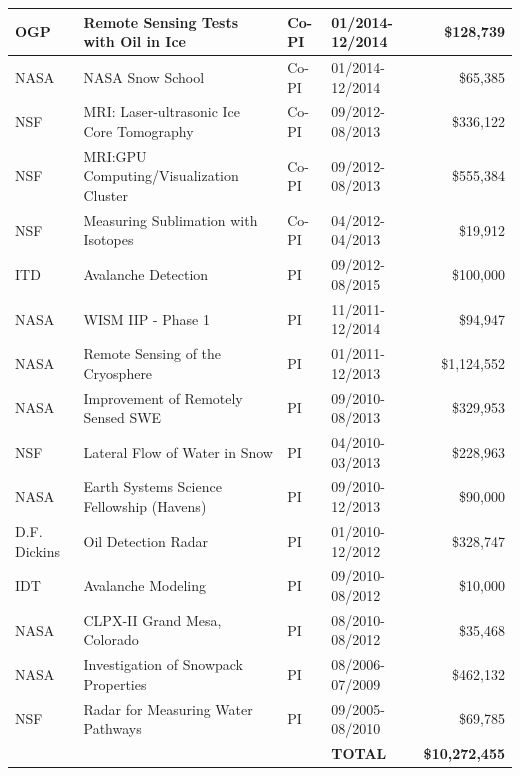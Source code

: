 \documentclass[11pt]{article}
\begin{document}
\begin{table}[!htbp]
\begin{tabular}{|l|l|l|l|r|}
OGP & Remote Sensing Tests with Oil in Ice & Co-PI & 01/2014-12/2014 & \$128,739 \\ \hline
NASA & NASA Snow School & Co-PI & 01/2014-12/2014 & \$65,385 \\ \hline
NSF & MRI: Laser-ultrasonic Ice Core Tomography & Co-PI & 09/2012-08/2013 & \$336,122 \\ \hline
NSF & MRI:GPU Computing/Visualization Cluster & Co-PI & 09/2012-08/2013 & \$555,384 \\ \hline
NSF & Measuring Sublimation with Isotopes & Co-PI & 04/2012-04/2013 & \$19,912 \\ \hline
ITD & Avalanche Detection & PI & 09/2012-08/2015 & \$100,000 \\ \hline
NASA & WISM IIP - Phase 1 & PI & 11/2011-12/2014 & \$94,947 \\ \hline
NASA & Remote Sensing of the Cryosphere & PI & 01/2011-12/2013 & \$1,124,552 \\ \hline
NASA & Improvement of Remotely Sensed SWE & PI & 09/2010-08/2013 & \$329,953 \\ \hline
NSF & Lateral Flow of Water in Snow & PI & 04/2010-03/2013 & \$228,963 \\ \hline
NASA & Earth Systems Science Fellowship (Havens) & PI & 09/2010-12/2013 & \$90,000 \\ \hline
D.F. Dickins & Oil Detection Radar & PI & 01/2010-12/2012 & \$328,747 \\ \hline
IDT & Avalanche Modeling & PI & 09/2010-08/2012 & \$10,000 \\ \hline
NASA & CLPX-II Grand Mesa, Colorado & PI & 08/2010-08/2012 & \$35,468 \\ \hline
NASA & Investigation of Snowpack Properties & PI & 08/2006-07/2009 & \$462,132 \\ \hline
NSF & Radar for Measuring Water Pathways & PI & 09/2005-08/2010 & \$69,785 \\ \hline
& &  & \textbf{TOTAL} & \textbf{\$10,272,455} \\ \hline
\end{tabular} %
\end{table}

\clearpage
\end{document}
